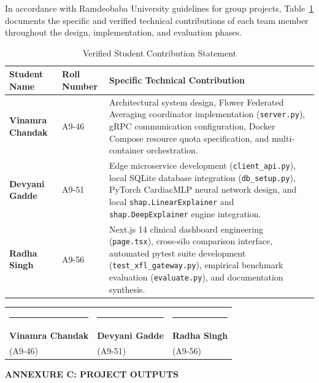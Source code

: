 \documentclass[12pt,a4paper,oneside]{report}
\begin{document}
In accordance with Ramdeobaba University guidelines for group projects, Table~\ref{tab:annexure_b} documents the specific and verified technical contributions of each team member throughout the design, implementation, and evaluation phases.

\begin{table}[H]
\centering
\caption{Verified Student Contribution Statement}
\label{tab:annexure_b}
\begin{tabularx}{\textwidth}{p{3.8cm} p{2.5cm} X}
\toprule
\textbf{Student Name} & \textbf{Roll Number} & \textbf{Specific Technical Contribution} \\
\midrule
\textbf{Vinamra Chandak} & A9-46 & Architectural system design, Flower Federated Averaging coordinator implementation (\texttt{server.py}), gRPC communication configuration, Docker Compose resource quota specification, and multi-container orchestration. \\
\midrule
\textbf{Devyani Gadde} & A9-51 & Edge microservice development (\texttt{client\_api.py}), local SQLite database integration (\texttt{db\_setup.py}), PyTorch CardiacMLP neural network design, and local \texttt{shap.LinearExplainer} and \texttt{shap.DeepExplainer} engine integration. \\
\midrule
\textbf{Radha Singh} & A9-56 & Next.js 14 clinical dashboard engineering (\texttt{page.tsx}), cross-silo comparison interface, automated pytest suite development (\texttt{test\_xfl\_gateway.py}), empirical benchmark evaluation (\texttt{evaluate.py}), and documentation synthesis. \\
\bottomrule
\end{tabularx}
\end{table}

\vspace{3.0em}
\noindent
\begin{tabularx}{\textwidth}{X X X}
\rule{4cm}{0.4pt} & \rule{4cm}{0.4pt} & \rule{4cm}{0.4pt} \\
\textbf{Vinamra Chandak} & \textbf{Devyani Gadde} & \textbf{Radha Singh} \\
(A9-46) & (A9-51) & (A9-56) \\
\end{tabularx}

\clearpage
\begin{center}
{\fontsize{14pt}{18pt}\bfseries\selectfont ANNEXURE C: PROJECT OUTPUTS}\\[1.5em]
\end{center}
\end{document}
